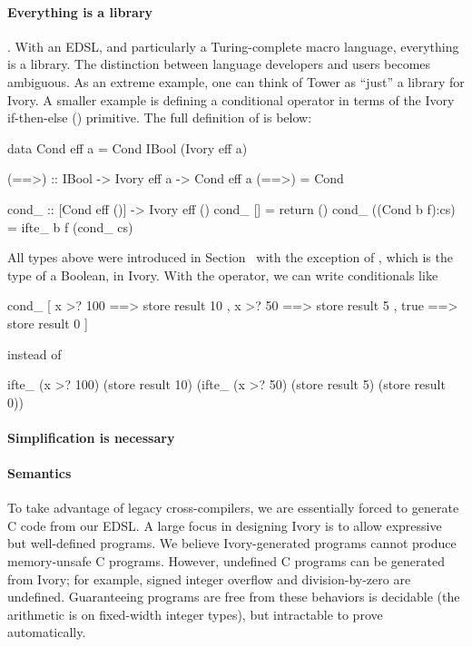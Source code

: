 \paragraph{Everything is a library}.  With an EDSL, and particularly a
    Turing-complete macro language, everything is a library.  The distinction
    between language developers and users becomes ambiguous.  As an extreme
    example, one can think of Tower as ``just'' a library for Ivory.  A smaller
    example is defining a conditional operator in terms of the Ivory
    if-then-else () primitive.  The full definition of  is below:
    \begin{code}
data Cond eff a = Cond IBool (Ivory eff a)

(==>) :: IBool -> Ivory eff a -> Cond eff a
(==>) = Cond

cond_ :: [Cond eff ()] -> Ivory eff ()
cond_ [] = return ()
cond_ ((Cond b f):cs) = ifte_ b f (cond_ cs)
    \end{code}
\noindent
All types above were introduced in Section~\cite{sec:ivory} with the exception
of , which is the type of a Boolean, in Ivory.  With the 
operator, we can write conditionals like
\begin{code}
cond_ [ x >? 100 ==> store result 10
      , x >? 50  ==> store result 5
      , true     ==> store result 0 ]
\end{code}
\noindent
instead of
\begin{code}
 ifte_ (x >? 100)
   (store result 10)
   (ifte_ (x >? 50)
     (store result 5)
       (store result 0))
\end{code}

\paragraph{Simplification is necessary}

\paragraph{Semantics}
To take advantage of legacy cross-compilers, we are essentially forced to
generate C code from our EDSL.  A large focus in designing Ivory is to allow
expressive but well-defined programs.  We believe Ivory-generated programs
cannot produce memory-unsafe C programs.  However, undefined C programs can be
generated from Ivory; for example, signed integer overflow and division-by-zero
are undefined.  Guaranteeing programs are free from these behaviors is decidable
(the arithmetic is on fixed-width integer types), but intractable to prove
automatically.

